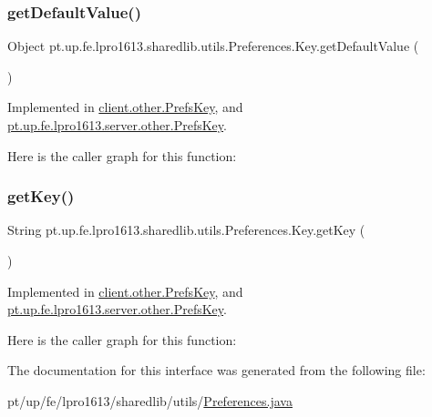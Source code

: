 \subsubsection{\texorpdfstring{get\+Default\+Value()}{getDefaultValue()}}
{\footnotesize\ttfamily Object pt.\+up.\+fe.\+lpro1613.\+sharedlib.\+utils.\+Preferences.\+Key.\+get\+Default\+Value (\begin{DoxyParamCaption}{ }\end{DoxyParamCaption})}



Implemented in \hyperlink{enumclient_1_1other_1_1_prefs_key_a7d50bec7ffef68ca2b9657cc4a8b271f}{client.\+other.\+Prefs\+Key}, and \hyperlink{enumpt_1_1up_1_1fe_1_1lpro1613_1_1server_1_1other_1_1_prefs_key_ab8700091048a80f746647cebab8a1876}{pt.\+up.\+fe.\+lpro1613.\+server.\+other.\+Prefs\+Key}.

Here is the caller graph for this function\+:
\hypertarget{interfacept_1_1up_1_1fe_1_1lpro1613_1_1sharedlib_1_1utils_1_1_preferences_1_1_key_af244cecb8edad1f87eaaa517c3590507}{}\label{interfacept_1_1up_1_1fe_1_1lpro1613_1_1sharedlib_1_1utils_1_1_preferences_1_1_key_af244cecb8edad1f87eaaa517c3590507} 
\subsubsection{\texorpdfstring{get\+Key()}{getKey()}}
{\footnotesize\ttfamily String pt.\+up.\+fe.\+lpro1613.\+sharedlib.\+utils.\+Preferences.\+Key.\+get\+Key (\begin{DoxyParamCaption}{ }\end{DoxyParamCaption})}



Implemented in \hyperlink{enumclient_1_1other_1_1_prefs_key_a204beaf7ef2607c5ee052bf712d5fc66}{client.\+other.\+Prefs\+Key}, and \hyperlink{enumpt_1_1up_1_1fe_1_1lpro1613_1_1server_1_1other_1_1_prefs_key_ab78cc090bf215b90b4387473ae17524a}{pt.\+up.\+fe.\+lpro1613.\+server.\+other.\+Prefs\+Key}.

Here is the caller graph for this function\+:


The documentation for this interface was generated from the following file\+:\begin{DoxyCompactItemize}
\item 
pt/up/fe/lpro1613/sharedlib/utils/\hyperlink{_preferences_8java}{Preferences.\+java}\end{DoxyCompactItemize}
